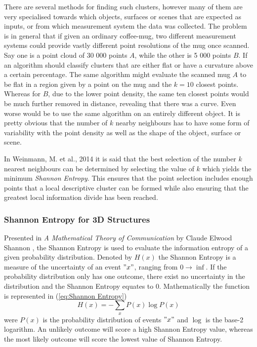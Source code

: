\documentclass[%
]{USN-MSc}
\begin{document}
There are several methods for finding such clusters, however many of them are very specialised towards which objects, surfaces or scenes that are expected as inputs, or from which measurement system the data was collected. The problem is in general that if given an ordinary coffee-mug, two different measurement systems could provide vastly different point resolutions of the mug once scanned. Say one is a point cloud of 30 000 points \(A\), while the other is 5 000 points \(B\). If an algorithm should classify clusters that are either flat or have a curvature above a certain percentage. The same algorithm might evaluate the scanned mug \(A\) to be flat in a region given by a point on the mug and the \(k=10\) closest points. Whereas for \(B\), due to the lower point density, the same ten closest points would be much further removed in distance, revealing that there was a curve. Even worse would be to use the same algorithm on an entirely different object. It is pretty obvious that the number of \(k\) nearby neighbours has to have some form of variability with the point density as well as the shape of the object, surface or scene.

In Weinmann, M. et al., 2014 \cite{optimal-K-Nearest-Neighborhood} it is said that the best selection of the number \(k\) nearest neighbours can be determined by selecting the value of \(k\) which yields the minimum \textit{Shannon Entropy}. This ensures that the point selection includes enough points that a local descriptive cluster can be formed while also ensuring that the greatest local information divide has been reached.

\subsubsection{Shannon Entropy for 3D Structures}
\label{subsub:Shannon Entropy}
Presented in \textit{A Mathematical Theory of Communication}  by Claude Elwood Shannon \cite{Shannon-Entropy}, the Shannon Entropy is used to evaluate the information entropy of a given probability distribution. Denoted by \(H(x)\) the Shannon Entropy is a measure of the uncertainty of an event \("x"\), ranging from \(0 \to \inf\). If the probability distribution only has one outcome, there exist no uncertainty in the distribution and the Shannon Entropy equates to \(0\). Mathematically the function is represented in (\ref{eq:Shannon Entropy})
\begin{equation}
    \label{eq:Shannon Entropy}
    H(x) = -\sum_x{{P(x)\log{P(x)}}}
\end{equation}
were \(P(x)\) is the probability distribution of events \("x"\) and \(\log\) is the base-2 logarithm. An unlikely outcome will score a high Shannon Entropy value, whereas the most likely outcome will score the lowest value of Shannon Entropy.
\end{document}
